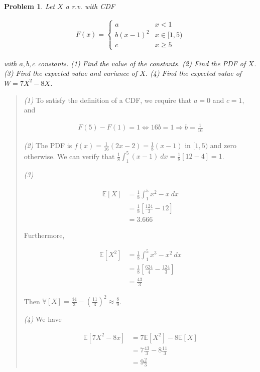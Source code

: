 \documentclass[a4paper, 12pt]{article}
\newtheorem{problem}{Problem}
\newtheorem{problem}{Problem}
\begin{document}
\begin{problem}
    Let $X$ a r.v. with CDF 

    \begin{align*}
        F(x) = \begin{cases}
            a & x < 1 \\ 
            b(x-1)^2 & x \in [1, 5) \\ 
            c & x \geq 5
        \end{cases}
    \end{align*}

    with $a, b, c$ constants. \textit{(1)} Find the value of the constants.
    \textit{(2)} Find the PDF of $X$. \textit{(3)} Find the expected value and
    variance of $X$. \textit{(4)} Find the expected value of $W = 7X^2 - 8X$.
\end{problem}


\small
\begin{quote}

\textit{(1)} To satisfy the definition of a CDF, we require that $a = 0$ and $c
= 1$, and

\begin{align*}
    F(5) - F(1) = 1 \iff 16b = 1 \Rightarrow b = \frac{1}{16}
\end{align*}

\textit{(2)} The PDF is $f(x) = \frac{1}{16}(2x - 2) = \frac{1}{8}(x - 1)$ in $[1, 5)$ and zero
otherwise. We can verify that $\frac{1}{8}\int_1^{5} (x - 1) ~ dx =
\frac{1}{8}\left[ 12 - 4 \right] = 1$.

\textit{(3)} 

\begin{align*}
    \mathbb{E}\left[ X \right]  &= \frac{1}{8}\int_1^{5} x^2 - x ~ dx \\ 
    &= \frac{1}{8} \left[ \frac{124}{3} - 12   \right] \\ 
    &= 3.666
\end{align*}

Furthermore,

\begin{align*}
    \mathbb{E}\left[ X^2 \right]  &= \frac{1}{8} \int_1^{5} x^3 - x^2 ~ dx \\ 
    &= \frac{1}{8} \left[ \frac{624}{4} - \frac{124}{3} \right]  \\ 
    &= \frac{43}{3}
\end{align*}

Then $\mathbb{V}\left[ X \right] = \frac{44}{3} - (\frac{11}{3})^2 \approx
\frac{8}{9}$. 

\textit{(4)} We have 

\begin{align*}
    \mathbb{E}\left[ 7X^2 - 8x \right] &= 7\mathbb{E}\left[ X^2 \right] -8
    \mathbb{E}\left[ X \right]  \\ 
                                       &=7 \frac{43}{3} - 8 \frac{11}{3} \\ 
                                       &= 9 \frac{2}{3}
\end{align*}

\end{quote}
\normalsize
\end{document}
